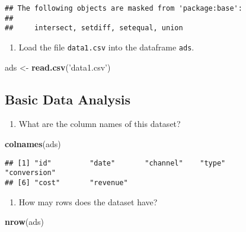 \documentclass[
]{article}
\newenvironment{Shaded}{\begin{snugshade}}{\end{snugshade}}
\newcommand{\KeywordTok}[1]{\textcolor[rgb]{0.13,0.29,0.53}{\textbf{#1}}}
\newcommand{\NormalTok}[1]{#1}
\newcommand{\StringTok}[1]{\textcolor[rgb]{0.31,0.60,0.02}{#1}}
\providecommand{\tightlist}{%
  \setlength{\itemsep}{0pt}\setlength{\parskip}{0pt}}
\begin{document}
\begin{verbatim}
## The following objects are masked from 'package:base':
## 
##     intersect, setdiff, setequal, union
\end{verbatim}

\begin{enumerate}
\def\labelenumi{\arabic{enumi}.}
\setcounter{enumi}{3}
\tightlist
\item
  Load the file \texttt{data1.csv} into the dataframe \texttt{ads}.
\end{enumerate}

\begin{Shaded}
\begin{Highlighting}[]
\NormalTok{ads <-}\StringTok{ }\KeywordTok{read.csv}\NormalTok{(}\StringTok{'data1.csv'}\NormalTok{)}
\end{Highlighting}
\end{Shaded}

\hypertarget{basic-data-analysis}{%
\subsection{Basic Data Analysis}\label{basic-data-analysis}}

\begin{enumerate}
\def\labelenumi{\arabic{enumi}.}
\setcounter{enumi}{3}
\tightlist
\item
  What are the column names of this dataset?
\end{enumerate}

\begin{Shaded}
\begin{Highlighting}[]
\KeywordTok{colnames}\NormalTok{(ads)}
\end{Highlighting}
\end{Shaded}

\begin{verbatim}
## [1] "id"         "date"       "channel"    "type"       "conversion"
## [6] "cost"       "revenue"
\end{verbatim}

\begin{enumerate}
\def\labelenumi{\arabic{enumi}.}
\setcounter{enumi}{4}
\tightlist
\item
  How may rows does the dataset have?
\end{enumerate}

\begin{Shaded}
\begin{Highlighting}[]
\KeywordTok{nrow}\NormalTok{(ads)}
\end{Highlighting}
\end{Shaded}
\end{document}
